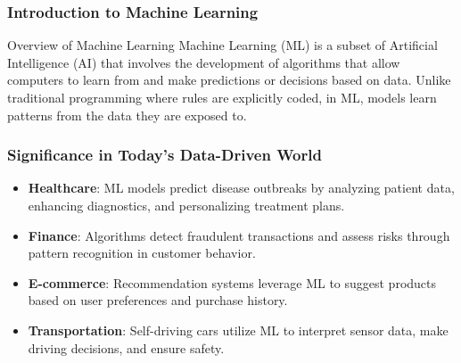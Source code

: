 \documentclass[aspectratio=169]{beamer}
\begin{document}
\frame{\titlepage}

\begin{frame}[fragile]
    \frametitle{Introduction to Machine Learning}
    \begin{block}{Overview of Machine Learning}
        Machine Learning (ML) is a subset of Artificial Intelligence (AI) that involves the development of algorithms that allow computers to learn from and make predictions or decisions based on data. Unlike traditional programming where rules are explicitly coded, in ML, models learn patterns from the data they are exposed to.
    \end{block}
\end{frame}

\begin{frame}[fragile]
    \frametitle{Significance in Today's Data-Driven World}
    \begin{itemize}
        \item \textbf{Healthcare}: 
            ML models predict disease outbreaks by analyzing patient data, enhancing diagnostics, and personalizing treatment plans.
        \item \textbf{Finance}: 
            Algorithms detect fraudulent transactions and assess risks through pattern recognition in customer behavior.
        \item \textbf{E-commerce}: 
            Recommendation systems leverage ML to suggest products based on user preferences and purchase history.
        \item \textbf{Transportation}: 
            Self-driving cars utilize ML to interpret sensor data, make driving decisions, and ensure safety.
    \end{itemize}
\end{frame}
\end{document}
